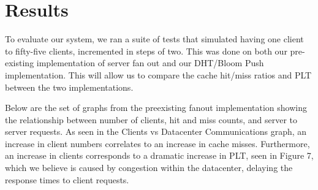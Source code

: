 \documentclass[conference]{IEEEtran}
\begin{document}
\section{Results}\label{sec:results}
To evaluate our system, we ran a suite of tests that simulated having one client to fifty-five clients, incremented in steps of two. This was done on both our pre-existing implementation of server fan out and our DHT/Bloom Push implementation.  This will allow us to compare the cache hit/miss ratios and PLT between the two implementations.

Below are the set of graphs from the preexisting fanout implementation showing the relationship between number of clients, hit and miss counts, and server to server requests. As seen in the Clients vs Datacenter Communications graph, an increase in client numbers correlates to an increase in cache misses. Furthermore, an increase in clients corresponds to a dramatic increase in PLT, seen in Figure 7, which we believe is caused by congestion within the datacenter, delaying the response times to client requests. 
\end{document}
